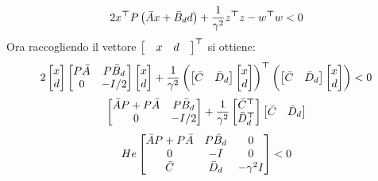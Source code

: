 \begin{equation}
\label{eq:imbuto_sys_gen_luya}
	2x^{{\bm \top}} P\left  (\bar{A}x + \bar{B}_dd\right ) +  \dfrac{1}{\gamma^2}z^{{\bm \top}} z - w^{{\bm \top}} w < 0
\end{equation}
Ora raccogliendo il vettore $ \begin{bmatrix} & x & d & \end{bmatrix} ^{{\bm \top}} $ si ottiene:
\begin{equation}
	2  \begin{bmatrix} x \\ d \end{bmatrix} \begin{bmatrix} P\bar{A} & P \bar{B}_d \\ 0 & -I/2 \end{bmatrix}  \begin{bmatrix} x \\ d \end{bmatrix} 
	+ \dfrac{1}{\gamma^2} \left ( \begin{bmatrix} \bar{C} & \bar{D}_d \end{bmatrix} \begin{bmatrix} x \\ d \end{bmatrix} \right ) ^{{\bm \top}} \left  ( \begin{bmatrix} \bar{C} & \bar{D}_d \end{bmatrix} \begin{bmatrix} x \\ d \end{bmatrix} \right ) < 0 
\end{equation}
\begin{equation}
	\begin{bmatrix} \bar{A}P + P\bar{A} & P \bar{B}_d \\ 0 & -I/2 \end{bmatrix} + \dfrac{1}{\gamma^2}\begin{bmatrix} \bar{C} ^{{\bm \top}} \\ \bar{D}_d ^{{\bm \top}} \end{bmatrix} \begin{bmatrix} \bar{C}  & \bar{D}_d \end{bmatrix}
\end{equation}
\begin{equation}
	He\begin{bmatrix} \bar{A}P + P\bar{A} & P \bar{B}_d & 0 \\ 0 & -I & 0 \\ \bar{C} & \bar{D}_d & -\gamma^2 I  \end{bmatrix} < 0
\end{equation}


